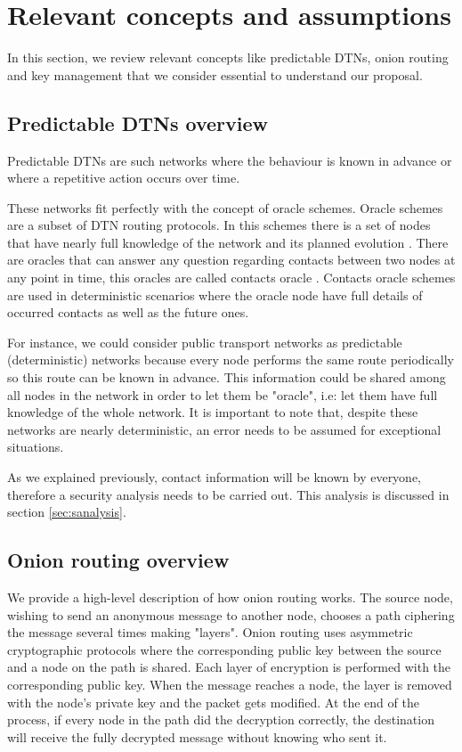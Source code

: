 \section{Relevant concepts and assumptions}\label{sec:relevant-concepts}

In this section, we review relevant concepts like predictable DTNs, onion routing and key management that we consider essential to understand our proposal.

\subsection{Predictable DTNs overview}

Predictable DTNs are such networks where the behaviour is known in advance or where a repetitive action occurs over time.

These networks fit perfectly with the concept of oracle schemes. Oracle schemes are a subset of DTN routing protocols. In this schemes there is a set of nodes that have nearly full knowledge of the network and its planned evolution \cite{dtn-book}. There are oracles that can answer any question regarding contacts between two nodes at any point in time, this oracles are called contacts oracle \cite{oracle-types}. Contacts oracle schemes are used in deterministic scenarios where the oracle node have full details of occurred contacts as well as the future ones.

For instance, we could consider public transport networks as predictable (deterministic) networks because every node performs the same route periodically so this route can be known in advance. This information could be shared among all nodes in the network in order to let them be "oracle", i.e: let them have full knowledge of the whole network. It is important to note that, despite these networks are nearly deterministic, an error needs to be assumed for exceptional situations.

As we explained previously, contact information will be known by everyone, therefore a security analysis needs to be carried out. This analysis is discussed in section \ref{sec:sanalysis}.

\subsection{Onion routing overview}

We provide a high-level description of how onion routing works. The source node, wishing to send an anonymous message to another node, chooses a path ciphering the message several times making "layers". Onion routing uses asymmetric cryptographic protocols where the corresponding public key between the source and a node on the path is shared. Each layer of encryption is performed with the corresponding public key. When the message reaches a node, the layer is removed with the node's private key and the packet gets modified. At the end of the process, if every node in the path did the decryption correctly, the destination will receive the fully decrypted message without knowing who sent it.

